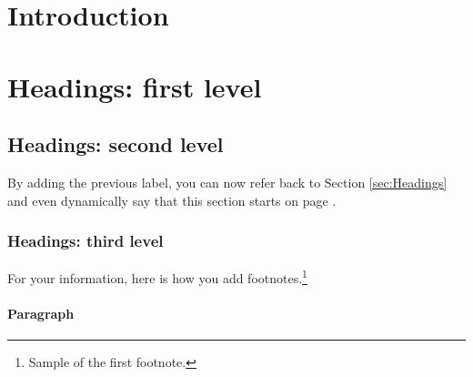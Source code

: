 
\begin{paper}
\renewcommand*{\pagemark}{}

\begin{abstract}
\lipsum[1]
\end{abstract}


\section*{Introduction} 
\lipsum[2]
\lipsum[3]

\section*{Headings: first level}
\label{sec:Headings} 
\lipsum[4]

\subsection*{Headings: second level}
By adding the previous label, you can now refer back to Section \ref{sec:Headings} and even dynamically say that this section starts on page \pageref{sec:Headings}.

\subsubsection*{Headings: third level}
For your information, here is how you add footnotes.\footnote{Sample of the first footnote.}

\paragraph{Paragraph}
\lipsum[7]


\end{paper}
